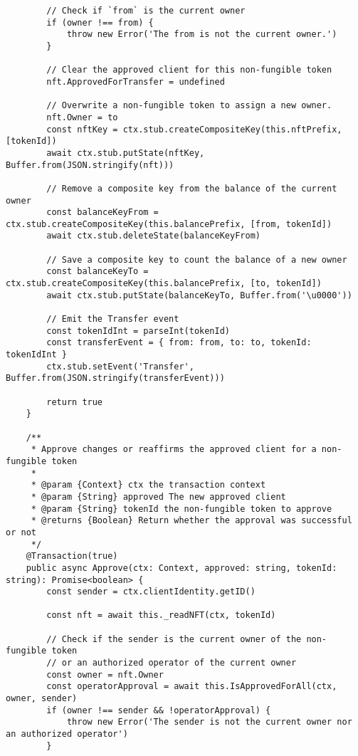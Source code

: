 \begin{lstlisting}
        // Check if `from` is the current owner
        if (owner !== from) {
            throw new Error('The from is not the current owner.')
        }

        // Clear the approved client for this non-fungible token
        nft.ApprovedForTransfer = undefined

        // Overwrite a non-fungible token to assign a new owner.
        nft.Owner = to
        const nftKey = ctx.stub.createCompositeKey(this.nftPrefix, [tokenId])
        await ctx.stub.putState(nftKey, Buffer.from(JSON.stringify(nft)))

        // Remove a composite key from the balance of the current owner
        const balanceKeyFrom = ctx.stub.createCompositeKey(this.balancePrefix, [from, tokenId])
        await ctx.stub.deleteState(balanceKeyFrom)

        // Save a composite key to count the balance of a new owner
        const balanceKeyTo = ctx.stub.createCompositeKey(this.balancePrefix, [to, tokenId])
        await ctx.stub.putState(balanceKeyTo, Buffer.from('\u0000'))

        // Emit the Transfer event
        const tokenIdInt = parseInt(tokenId)
        const transferEvent = { from: from, to: to, tokenId: tokenIdInt }
        ctx.stub.setEvent('Transfer', Buffer.from(JSON.stringify(transferEvent)))

        return true
    }

    /**
     * Approve changes or reaffirms the approved client for a non-fungible token
     *
     * @param {Context} ctx the transaction context
     * @param {String} approved The new approved client
     * @param {String} tokenId the non-fungible token to approve
     * @returns {Boolean} Return whether the approval was successful or not
     */
    @Transaction(true)
    public async Approve(ctx: Context, approved: string, tokenId: string): Promise<boolean> {
        const sender = ctx.clientIdentity.getID()

        const nft = await this._readNFT(ctx, tokenId)

        // Check if the sender is the current owner of the non-fungible token
        // or an authorized operator of the current owner
        const owner = nft.Owner
        const operatorApproval = await this.IsApprovedForAll(ctx, owner, sender)
        if (owner !== sender && !operatorApproval) {
            throw new Error('The sender is not the current owner nor an authorized operator')
        }


\end{lstlisting}
